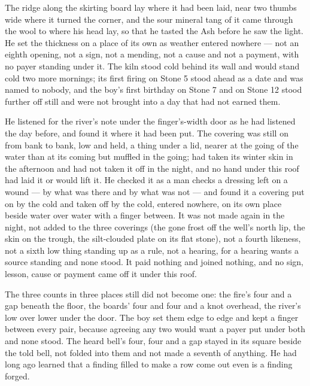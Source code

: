 The ridge along the skirting board lay where it had been laid, near two thumbs wide where it turned the corner, and the sour mineral tang of it came through the wool to where his head lay, so that he tasted the Ash before he saw the light. He set the thickness on a place of its own as weather entered nowhere --- not an eighth opening, not a sign, not a mending, not a cause and not a payment, with no payer standing under it. The kiln stood cold behind its wall and would stand cold two more mornings; its first firing on Stone 5 stood ahead as a date and was named to nobody, and the boy's first birthday on Stone 7 and  on Stone 12 stood further off still and were not brought into a day that had not earned them.

\scenebreak

He listened for the river's note under the finger's-width door as he had listened the day before, and found it where it had been put. The covering was still on from bank to bank, low and held, a thing under a lid, nearer at the going of the water than at its coming but muffled in the going;  had taken its winter skin in the afternoon and had not taken it off in the night, and no hand under this roof had laid it or would lift it. He checked it as a man checks a dressing left on a wound --- by what was there and by what was not --- and found it a covering put on by the cold and taken off by the cold, entered nowhere, on its own place beside water over water with a finger between. It was not made again in the night, not added to the three coverings (the gone frost off the well's north lip, the skin on the trough, the silt-clouded plate on its flat stone), not a fourth likeness, not a sixth low thing standing up as a rule, not a hearing, for a hearing wants a source standing and none stood. It paid nothing and joined nothing, and no sign, lesson, cause or payment came off it under this roof.

The three counts in three places still did not become one: the fire's four and a gap beneath the floor, the boards' four and four and a knot overhead, the river's low over lower under the door. The boy set them edge to edge and kept a finger between every pair, because agreeing any two would want a payer put under both and none stood. The heard bell's four, four and a gap stayed in its square beside the told bell, not folded into them and not made a seventh of anything. He had long ago learned that a finding filled to make a row come out even is a finding forged.

